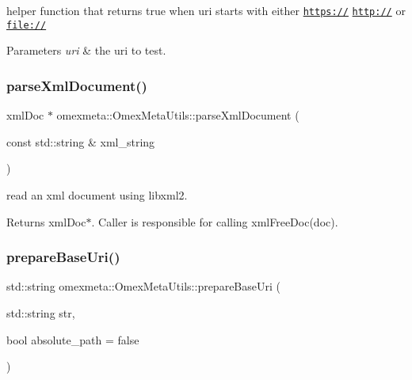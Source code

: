 helper function that returns true when uri starts with either {\ttfamily \href{https://}{\tt https\+://}} {\ttfamily \href{http://}{\tt http\+://}} or {\ttfamily \href{file://}{\tt file\+://}} 


\begin{DoxyParams}{Parameters}
{\em uri} & the uri to test. \\
\hline
\end{DoxyParams}
\mbox{\label{classomexmeta_1_1OmexMetaUtils_a718710d8ba7fc7598bd73a5456b3d903}} 
\subsubsection{\texorpdfstring{parse\+Xml\+Document()}{parseXmlDocument()}}
{\footnotesize\ttfamily xml\+Doc $\ast$ omexmeta\+::\+Omex\+Meta\+Utils\+::parse\+Xml\+Document (\begin{DoxyParamCaption}\item[{const std\+::string \&}]{xml\+\_\+string }\end{DoxyParamCaption})\hspace{0.3cm}{\ttfamily [static]}}



read an xml document using libxml2. 

\begin{DoxyReturn}{Returns}
xml\+Doc$\ast$. Caller is responsible for calling xml\+Free\+Doc(doc). 
\end{DoxyReturn}
\mbox{\label{classomexmeta_1_1OmexMetaUtils_a6694715cf3f5dccd33d416ecc84ff375}} 
\subsubsection{\texorpdfstring{prepare\+Base\+Uri()}{prepareBaseUri()}}
{\footnotesize\ttfamily std\+::string omexmeta\+::\+Omex\+Meta\+Utils\+::prepare\+Base\+Uri (\begin{DoxyParamCaption}\item[{std\+::string}]{str,  }\item[{bool}]{absolute\+\_\+path = {\ttfamily false} }\end{DoxyParamCaption})\hspace{0.3cm}{\ttfamily [static]}}




